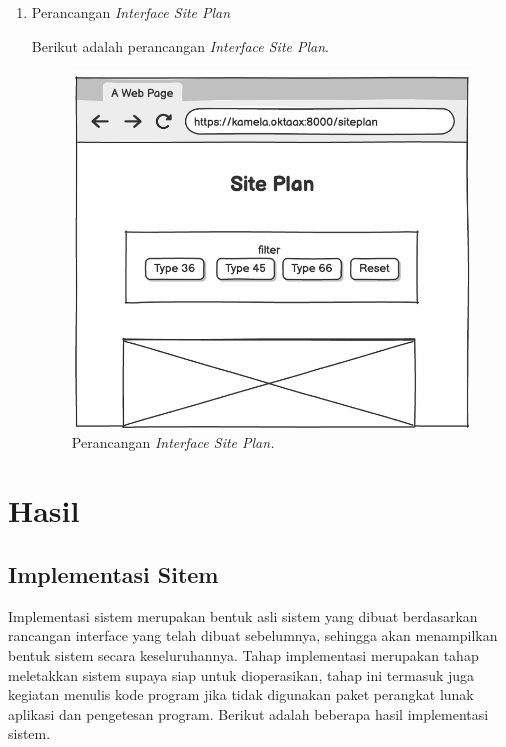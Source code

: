 \begin{enumerate}
        \item Perancangan \textit{Interface Site Plan}
        \par Berikut adalah perancangan \textit{Interface Site Plan}.
        \begin{figure}
            \centering
            \includegraphics[width=0.72\linewidth]{Wireframe/Site Plan.png}
            \caption{Perancangan \textit{Interface Site Plan.}}
        \end{figure}

    \end{enumerate}
\section{Hasil}

\subsection{Implementasi Sitem}
\par Implementasi sistem merupakan bentuk asli sistem yang dibuat berdasarkan rancangan interface yang telah dibuat sebelumnya, sehingga akan menampilkan bentuk sistem secara keseluruhannya. Tahap implementasi merupakan tahap meletakkan sistem supaya siap untuk dioperasikan, tahap ini termasuk juga kegiatan menulis kode program jika tidak digunakan paket perangkat lunak aplikasi dan pengetesan program. Berikut adalah beberapa hasil implementasi sistem.

